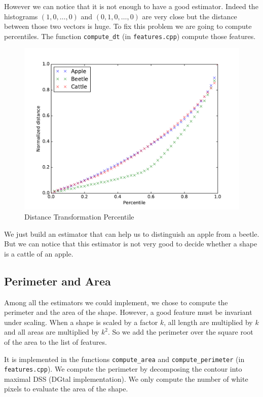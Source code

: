 \documentclass[a4paper, 11pt]{article}
\begin{document}
However we can notice that it is not enough to have a good estimator. Indeed the histograms $(1, 0, \dots, 0)$ and $(0, 1, 0, \dots, 0)$ are very close but the distance between those two vectors is huge. To fix this problem we are going to compute percentiles. The function \verb|compute_dt| (in \verb|features.cpp|) compute those features.
\begin{figure}[h!]
\centering
\includegraphics[width=13cm]{percentiles.pdf}
\caption{Distance Transformation Percentile}
\end{figure}

We just build an estimator that can help us to distinguish an apple from a beetle. But we can notice that this estimator is not very good to decide whether a shape is a cattle of an apple.

\newpage
\subsection{Perimeter and Area}
Among all the estimators we could implement, we chose to compute the perimeter and the area of the shape. However, a good feature must be invariant under scaling. When a shape is scaled by a factor $k$, all length are multiplied by $k$ and all areas are multiplied by $k^2$. So we add the perimeter over the square root of the area to the list of features.

\medskip It is implemented in the functions \verb|compute_area| and \verb|compute_perimeter| (in \verb|features.cpp|). We compute the perimeter by decomposing the contour into maximal DSS (DGtal implementation). We only compute the number of white pixels to evaluate the area of the shape.
\end{document}
